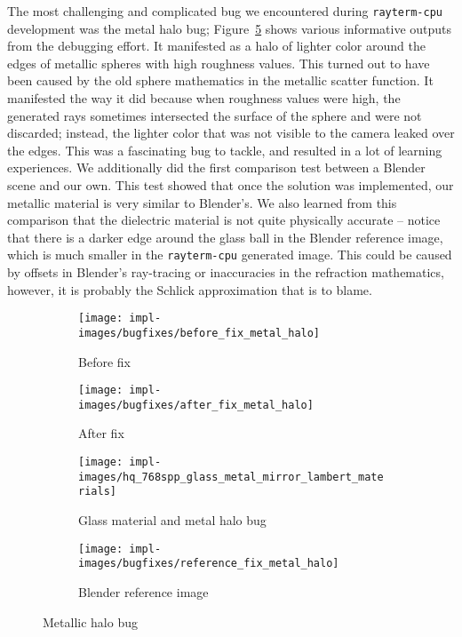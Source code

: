 The most challenging and complicated bug we encountered during \texttt{rayterm-cpu} development was the metal halo bug; Figure~\ref{fig:rayterm-cpu_halo_bug} shows various informative outputs from the debugging effort.
It manifested as a halo of lighter color around the edges of metallic spheres with high roughness values.
This turned out to have been caused by the old sphere mathematics in the metallic scatter function.
It manifested the way it did because when roughness values were high, the generated rays sometimes intersected the surface of the sphere and were not discarded; instead, the lighter color that was not visible to the camera leaked over the edges.
This was a fascinating bug to tackle, and resulted in a lot of learning experiences.
We additionally did the first comparison test between a Blender \cite{blender} scene and our own.
This test showed that once the solution was implemented, our metallic material is very similar to Blender's.
We also learned from this comparison that the dielectric material is not quite physically accurate -- notice that there is a darker edge around the glass ball in the Blender reference image, which is much smaller in the \texttt{rayterm-cpu} generated image.
This could be caused by offsets in Blender's ray-tracing or inaccuracies in the refraction mathematics, however, it is probably the Schlick approximation \cite{schlick1994inexpensive} that is to blame.

\vspace{0.3em}
\begin{figure}[htb]
  \centering
  \begin{subfigure}[htb]{0.45\textwidth}
    \texttt{[image: impl-images/bugfixes/before\_fix\_metal\_halo]}
    \caption{Before fix}
    \label{fig:rayterm-cpu_halo_before}
  \end{subfigure}
  \begin{subfigure}[htb]{0.45\textwidth}
    \texttt{[image: impl-images/bugfixes/after\_fix\_metal\_halo]}
    \caption{After fix}
    \label{fig:rayterm-cpu_halo_after}
  \end{subfigure}
  \begin{subfigure}[htb]{0.45\textwidth}
    \texttt{[image: impl-images/hq\_768spp\_glass\_metal\_mirror\_lambert\_materials]}
    \caption{Glass material and metal halo bug}
    \label{fig:rayterm-cpu_glass_metal_bug}
  \end{subfigure}
  \begin{subfigure}[htb]{0.45\textwidth}
    \texttt{[image: impl-images/bugfixes/reference\_fix\_metal\_halo]}
    \caption{Blender reference image}
    \label{fig:rayterm-cpu_halo_reference}
  \end{subfigure}
  \caption{Metallic halo bug}
  \label{fig:rayterm-cpu_halo_bug}
\end{figure}

